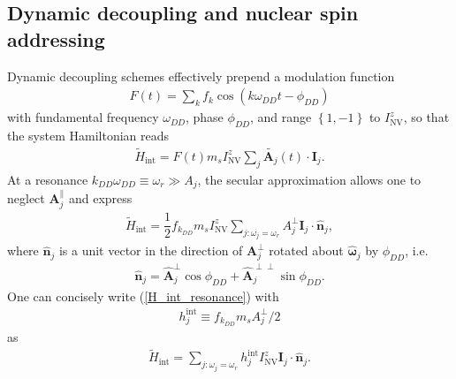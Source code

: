 \documentclass[twocolumn]{revtex4}
\renewcommand{\t}{\text} %
\newcommand{\f}[2]{\dfrac{#1}{#2}} %
\newcommand{\p}[1]{\left(#1\right)} %
\renewcommand{\set}[1]{\left\{#1\right\}} %
\renewcommand{\v}{\bm} %
\newcommand{\uv}[1]{\hat{\v{#1}}} %
\renewcommand{\c}{\cdot} %
\newcommand{\NV}{\t{NV}}
\begin{document}
\subsection{Dynamic decoupling and nuclear spin addressing}

Dynamic decoupling schemes effectively prepend a modulation function
\begin{align}
  F\p{t}=\sum_kf_k\cos\p{k\omega_{DD}t-\phi_{DD}}
\end{align}
with fundamental frequency $\omega_{DD}$, phase $\phi_{DD}$, and range
$\set{1,-1}$ to $I_\NV^z$, so that the system Hamiltonian reads
\begin{align}
  \tilde H_\t{int} =
  F\p{t}m_sI_\NV^z\sum_j\tilde{\v A_j}\p{t}\c\v I_j.
\end{align}
At a resonance $k_{DD}\omega_{DD}\equiv\omega_r\gg A_j$, the secular
approximation allows one to neglect $\v A_j^\parallel$ and express
\begin{align}
  \tilde H_\t{int} = \f12 f_{k_{DD}} m_sI_\NV^z
  \sum_{j:\omega_j=\omega_r} A_j^\perp\v I_j\c\uv n_j,
  \label{H_int_resonance}
\end{align}
where $\uv n_j$ is a unit vector in the direction of $\v A_j^\perp$
rotated about $\uv\omega_j$ by $\phi_{DD}$, i.e.
\begin{align}
  \uv n_j = \uv A_j^\perp\cos\phi_{DD} +
  \uv A_j^{\perp\perp}\sin\phi_{DD}.
\end{align}
One can concisely write (\ref{H_int_resonance}) with
\begin{align}
h_j^\t{int}\equiv f_{k_{DD}}m_sA_j^\perp/2
\end{align}
as
\begin{align}
  \tilde H_\t{int} = \sum_{j:\omega_j=\omega_r}
  h_j^\t{int}I_\NV^z\v I_j\c\uv n_j.
  \label{H_int}
\end{align}
\end{document}
